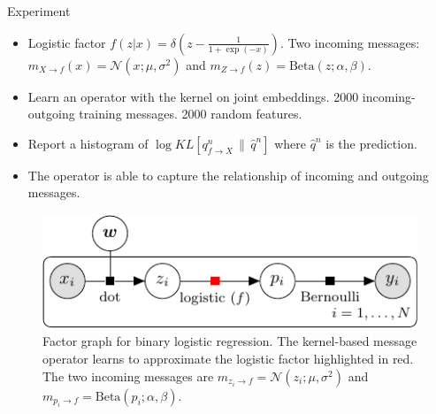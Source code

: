 \documentclass[english]{beamer}
\newcommand{\factor}{f}				%
\newcommand{\msg}[2]{m_{#1 \rightarrow #2}}			%
\begin{document}
\begin{frame}
\begin{columns}[t]
\begin{block}{ Experiment}
\begin{itemize}
\item \justifying{}Logistic factor $f(z|x)=\delta\left(z-\frac{1}{1+\exp(-x)}\right)$.
Two incoming messages: 
$m_{X\rightarrow f}(x)=\mathcal{N}(x;\mu,\sigma^{2})$
and $m_{Z\rightarrow f}(z)=\text{Beta}(z;\alpha,\beta)$. 
\item Learn an operator
with the kernel on joint embeddings. 2000 incoming-outgoing training messages. 2000 random features.
\item Report a histogram of $\log KL[q_{f\rightarrow X}^{n}\,\|\,\hat{q}^{n}]$
where $\hat{q}^{n}$ is the prediction.
\item The operator is able to capture the relationship of incoming and outgoing
messages.
\end{itemize}


\begin{figure}[ht]
\centering

\includegraphics[width=15cm]{../uai2015/img/binary_logistic_regression-crop}

\caption{Factor graph for binary logistic regression. 
The kernel-based message operator learns to approximate the logistic factor 
highlighted in red. The two incoming messages are 
$\msg{z_i}{\factor} = \mathcal{N}(z_i; \mu, \sigma^2)$ and 
$\msg{p_i}{\factor} = \text{Beta}(p_i; \alpha, \beta) $. 
}
\label{fig:factor_graph_binlog}
\end{figure}


% 



\end{block}
\end{columns}
\end{frame}
\end{document}
